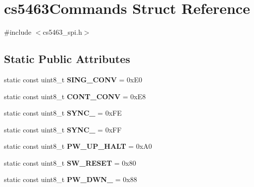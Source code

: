 \hypertarget{structcs5463Commands}{\section{cs5463\-Commands Struct Reference}
\label{structcs5463Commands}
}


{\ttfamily \#include $<$cs5463\-\_\-spi.\-h$>$}

\subsection*{Static Public Attributes}
\begin{DoxyCompactItemize}
\item 
\hypertarget{structcs5463Commands_a5b2237009db82fa709b68c948b74d46e}{static const uint8\-\_\-t {\bfseries S\-I\-N\-G\-\_\-\-C\-O\-N\-V} = 0x\-E0}\label{structcs5463Commands_a5b2237009db82fa709b68c948b74d46e}

\item 
\hypertarget{structcs5463Commands_af5ab67200e5f55130d28884adbacb949}{static const uint8\-\_\-t {\bfseries C\-O\-N\-T\-\_\-\-C\-O\-N\-V} = 0x\-E8}\label{structcs5463Commands_af5ab67200e5f55130d28884adbacb949}

\item 
\hypertarget{structcs5463Commands_a5a3ab609b2a1da80714480ec93c3d2b7}{static const uint8\-\_\-t {\bfseries S\-Y\-N\-C\-\_} = 0x\-F\-E}\label{structcs5463Commands_a5a3ab609b2a1da80714480ec93c3d2b7}

\item 
\hypertarget{structcs5463Commands_a8adaa71757355cd8623b4f195ebf90e4}{static const uint8\-\_\-t {\bfseries S\-Y\-N\-C\-\_} = 0x\-F\-F}\label{structcs5463Commands_a8adaa71757355cd8623b4f195ebf90e4}

\item 
\hypertarget{structcs5463Commands_a8b5904a8ef599d21b420c5559184ab7d}{static const uint8\-\_\-t {\bfseries P\-W\-\_\-\-U\-P\-\_\-\-H\-A\-L\-T} = 0x\-A0}\label{structcs5463Commands_a8b5904a8ef599d21b420c5559184ab7d}

\item 
\hypertarget{structcs5463Commands_a438a967099bd404d332927096e016a75}{static const uint8\-\_\-t {\bfseries S\-W\-\_\-\-R\-E\-S\-E\-T} = 0x80}\label{structcs5463Commands_a438a967099bd404d332927096e016a75}

\item 
\hypertarget{structcs5463Commands_a223cf02bb94dc52d4b96dd00da6ed26e}{static const uint8\-\_\-t {\bfseries P\-W\-\_\-\-D\-W\-N\-\_} = 0x88}\label{structcs5463Commands_a223cf02bb94dc52d4b96dd00da6ed26e}


\end{DoxyCompactItemize}
